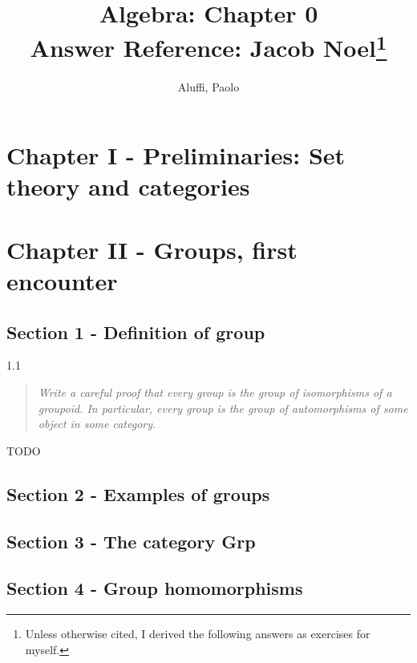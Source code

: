 \documentclass[letterpaper,12pt]{article}
\theoremstyle{definition}
\begin{document}
\title{Algebra: Chapter 0 \\ {\small Answer Reference: Jacob Noel\footnote{Unless otherwise cited, I derived the following answers as exercises for myself.}}}
\author{Aluffi, Paolo}


{\let\newpage\relax\maketitle}


\pagebreak
\section*{Chapter I - Preliminaries: Set theory and categories}


\pagebreak

\section*{Chapter II - Groups, first encounter}

\subsection*{Section 1 - Definition of group}

\begin{flushleft}
	1.1
\end{flushleft}

\begin{quote}
	\textit{Write a careful proof that every group is the group of isomorphisms of a groupoid. In particular, every group is the group of automorphisms of some object in some category.}
\end{quote}

TODO


\subsection*{Section 2 - Examples of groups}



\subsection*{Section 3 - The category \textbf{Grp}}
\subsection*{Section 4 - Group homomorphisms}
\end{document}
